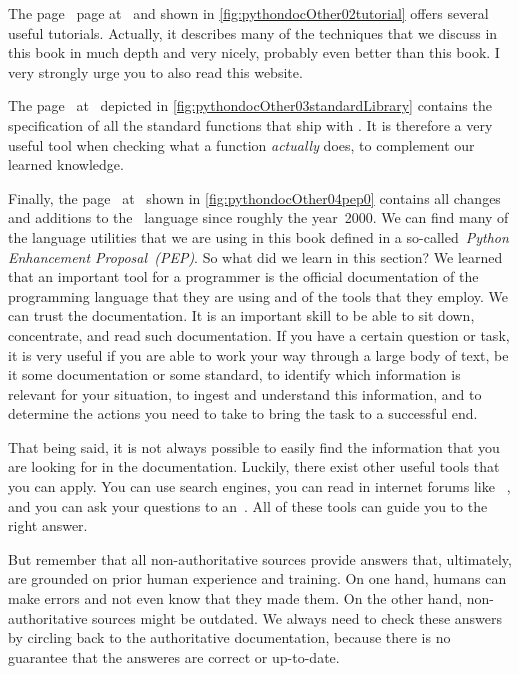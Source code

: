 The  page~\cite{PSF:P3D:TPT} page at~ and shown in \cref{fig:pythondocOther02tutorial} offers several useful tutorials.
Actually, it describes many of the techniques that we discuss in this book in much depth and very nicely, probably even better than this book.
I very strongly urge you to also read this website.

The  page~\cite{PSF:P3D:TPSL} at~ depicted in \cref{fig:pythondocOther03standardLibrary} contains the specification of all the standard functions that ship with \python.
It is therefore a very useful tool when checking what a function \emph{actually} does, to complement our learned knowledge.

Finally, the  page~\cite{PEP0} at~ shown in \cref{fig:pythondocOther04pep0} contains all changes and additions to the \python\ language since roughly the year~2000.
We can find many of the language utilities that we are using in this book defined in a so-called~\emph{Python Enhancement Proposal~(PEP)}.%
%
\endhsection%
%
%
So what did we learn in this section?
We learned that an important tool for a programmer is the official documentation of the programming language that they are using and of the tools that they employ.
We can trust the documentation.
It is an important skill to be able to sit down, concentrate, and read such documentation.
If you have a certain question or task, it is very useful if you are able to work your way through a large body of text, be it some documentation or some standard, to identify which information is relevant for your situation, to ingest and understand this information, and to determine the actions you need to take to bring the task to a successful end.

That being said, it is not always possible to easily find the information that you are looking for in the documentation.
Luckily, there exist other useful tools that you can apply.
You can use search engines, you can read in internet forums like ~\cite{SE:SO}, and you can ask your questions to an~.
All of these tools can guide you to the right answer.

But remember that all non-authoritative sources provide answers that, ultimately, are grounded on prior human experience and training.
On one hand, humans can make errors and not even know that they made them.
On the other hand, non-authoritative sources might be outdated.
We always need to check these answers by circling back to the authoritative documentation, because there is no guarantee that the answeres are correct or up-to-date.

